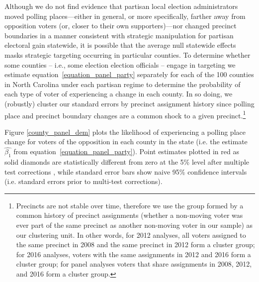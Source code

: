 \documentclass[12pt]{article}
\begin{document}
Although we do not find evidence that partisan local election administrators moved polling places---either in general, or more specifically, farther away from opposition voters (or, closer to their own supporters)---nor changed precinct boundaries in a manner consistent with strategic manipulation for partisan electoral gain statewide, it is possible that the average null statewide effects masks strategic targeting occurring in particular counties.  To determine whether some counties -- i.e., some election election officials -- engage in targeting we estimate equation~\ref{equation_panel_party} separately for each of the 100 counties in North Carolina under each partisan regime to determine the probability of each type of voter of experiencing a change in each county. In so doing, we (robustly) cluster our standard errors by precinct assignment history since polling place and precinct boundary changes are a common shock to a given precinct.\footnote{Precincts are not stable over time, therefore we use the group formed by a common history of precinct assignments (whether a non-moving voter was ever part of the same precinct as another non-moving voter in our sample) as our clustering unit. In other words, for 2012 analyses, all voters assigned to the same precinct in 2008 and the same precinct in 2012 form a cluster group; for 2016 analyses, voters with the same assignments in 2012 and 2016 form a cluster group; for panel analyses voters that share assignments in 2008, 2012, and 2016 form a cluster group.}

Figure \ref{county_panel_dem} plots the likelihood of experiencing a polling place change for voters of the opposition in each county in the state (i.e. the estimate $\hat{\beta_{1}}$ from equation~\ref{equation_panel_party}). Point estimates plotted in red as solid diamonds are statistically different from zero at the 5\% level after multiple test corrections \citep{Benjamini:2006gd}, while standard error bars show naive 95\% confidence intervals (i.e. standard errors prior to multi-test corrections).

\end{document}
